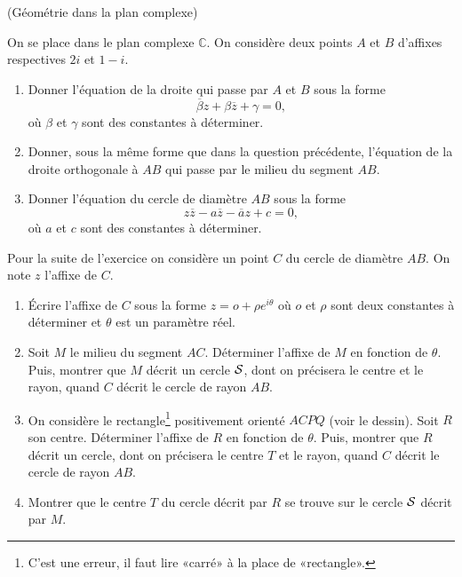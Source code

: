 \documentclass[a4paper,12pt,reqno]{amsart}
\begin{document}
\begin{exo} (Géométrie dans la plan complexe)

  On se place dans le plan complexe $\mathbb{C}$. On considère deux points $A$ et $B$ d'affixes respectives $2i$ et $1-i$.

  \begin{enumerate}
    \item Donner l'équation de la droite qui passe par $A$ et $B$ sous la forme
    $$
      \overline{\beta}z+\beta\overline{z}+\gamma=0,
    $$
    où $\beta$ et $\gamma$ sont des constantes à déterminer.
    \item Donner, sous la même forme que dans la question précédente, l'équation de la droite orthogonale à $AB$ qui passe par le milieu du segment $AB$.
    \item Donner l'équation du cercle de diamètre $AB$ sous la forme
      $$
        z\overline{z}-a\overline{z}-\overline{a}z+c=0,
      $$
      où $a$ et $c$ sont des constantes à déterminer.
  \end{enumerate}

  \vspace{4mm}
  Pour la suite de l'exercice on considère un point $C$ du cercle de diamètre $AB$. On note $z$ l'affixe de $C$.\\
  \vspace{-11mm}

  \begin{enumerate}[resume]
    \item Écrire l'affixe de $C$ sous la forme $z = o + \rho e^{i\theta}$ où $o$ et $\rho$ sont deux constantes à déterminer et $\theta$ est un paramètre réel.
    \item Soit $M$ le milieu du segment $AC$. Déterminer l'affixe de $M$ en fonction de $\theta$. Puis, montrer que $M$ décrit un cercle $\mathcal{S}$, dont on précisera le centre et le rayon, quand $C$ décrit le cercle de rayon $AB$.
    \item On considère le rectangle\footnote{C'est une erreur, il faut lire «carré» à la place de «rectangle».} positivement orienté $ACPQ$ (voir le dessin). Soit $R$ son centre. Déterminer l'affixe de $R$ en fonction de $\theta$. Puis, montrer que $R$ décrit un cercle, dont on précisera le centre $T$ et le rayon, quand $C$ décrit le cercle de rayon $AB$.
    \item Montrer que le centre $T$ du cercle décrit par $R$ se trouve sur le cercle $\mathcal{S}$ décrit par $M$.
  \end{enumerate}

\end{exo}
\end{document}
